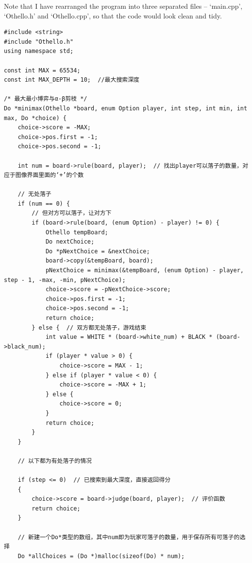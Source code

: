 \documentclass[a4paper, 11pt]{article}
\begin{document}
Note that I have rearranged the program into three separated files -- `main.cpp', `Othello.h' and `Othello.cpp', so that the code would look clean and tidy.
\begin{lstlisting}[title=main.cpp]
#include <string>
#include "Othello.h"
using namespace std;

const int MAX = 65534;
const int MAX_DEPTH = 10;  //最大搜索深度

/* 最大最小博弈与α-β剪枝 */
Do *minimax(Othello *board, enum Option player, int step, int min, int max, Do *choice) {
    choice->score = -MAX;
    choice->pos.first = -1;
    choice->pos.second = -1;

    int num = board->rule(board, player);  // 找出player可以落子的数量，对应于图像界面里面的‘+’的个数

    // 无处落子
    if (num == 0) {
        // 但对方可以落子，让对方下
        if (board->rule(board, (enum Option) - player) != 0) {
            Othello tempBoard;
            Do nextChoice;
            Do *pNextChoice = &nextChoice;
            board->copy(&tempBoard, board);
            pNextChoice = minimax(&tempBoard, (enum Option) - player, step - 1, -max, -min, pNextChoice);
            choice->score = -pNextChoice->score;
            choice->pos.first = -1;
            choice->pos.second = -1;
            return choice;
        } else {  // 双方都无处落子，游戏结束
            int value = WHITE * (board->white_num) + BLACK * (board->black_num);
            if (player * value > 0) {
                choice->score = MAX - 1;
            } else if (player * value < 0) {
                choice->score = -MAX + 1;
            } else {
                choice->score = 0;
            }
            return choice;
        }
    }

    // 以下都为有处落子的情况

    if (step <= 0)  // 已搜索到最大深度，直接返回得分
    {
        choice->score = board->judge(board, player);  // 评价函数
        return choice;
    }

    // 新建一个Do*类型的数组，其中num即为玩家可落子的数量，用于保存所有可落子的选择
    Do *allChoices = (Do *)malloc(sizeof(Do) * num);


\end{lstlisting}
\end{document}
